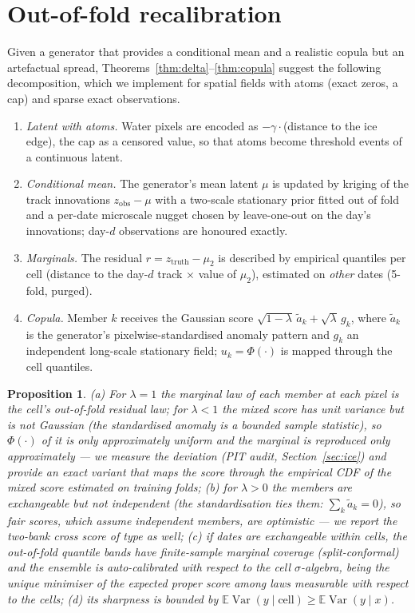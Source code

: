 \documentclass[11pt]{article}
\newtheorem{proposition}{Proposition}
\newcommand{\E}{\mathbb{E}}
\begin{document}
\section{Out-of-fold recalibration}
\label{sec:layer}
Given a generator that provides a conditional mean and a realistic copula but an artefactual spread, Theorems~\ref{thm:delta}--\ref{thm:copula} suggest the following decomposition, which we implement for spatial fields with atoms (exact zeros, a cap) and sparse exact observations.
\begin{enumerate}
\item \emph{Latent with atoms.} Water pixels are encoded as $-\gamma\cdot$(distance to the ice edge), the cap as a censored value, so that atoms become threshold events of a continuous latent.
\item \emph{Conditional mean.} The generator's mean latent $\mu$ is updated by kriging of the track innovations $z_{\mathrm{obs}}-\mu$ with a two-scale stationary prior fitted out of fold and a per-date microscale nugget chosen by leave-one-out on the day's innovations; day-$d$ observations are honoured exactly.
\item \emph{Marginals.} The residual $r=z_{\mathrm{truth}}-\mu_2$ is described by empirical quantiles per cell (distance to the day-$d$ track $\times$ value of $\mu_2$), estimated on \emph{other} dates (5-fold, purged).
\item \emph{Copula.} Member $k$ receives the Gaussian score $\sqrt{1-\lambda}\,\tilde a_k+\sqrt\lambda\,g_k$, where $\tilde a_k$ is the generator's pixelwise-standardised anomaly pattern and $g_k$ an independent long-scale stationary field; $u_k=\Phi(\cdot)$ is mapped through the cell quantiles.
\end{enumerate}
\begin{proposition}
\label{prop:layer}
(a) For $\lambda=1$ the marginal law of each member at each pixel is the cell's out-of-fold residual law; for $\lambda<1$ the mixed score has unit variance but is not Gaussian (the standardised anomaly is a bounded sample statistic), so $\Phi(\cdot)$ of it is only approximately uniform and the marginal is reproduced only approximately --- we measure the deviation (PIT audit, Section~\ref{sec:ice}) and provide an exact variant that maps the score through the empirical CDF of the mixed score estimated on training folds; (b) for $\lambda>0$ the members are exchangeable but not independent (the standardisation ties them: $\sum_k\tilde a_k=0$), so fair scores, which assume independent members, are optimistic --- we report the two-bank cross score of \citet{roberts2026} type as well; (c) if dates are exchangeable within cells, the out-of-fold quantile bands have finite-sample marginal coverage (split-conformal) and the ensemble is auto-calibrated with respect to the cell $\sigma$-algebra, being the unique minimiser of the expected proper score among laws measurable with respect to the cells; (d) its sharpness is bounded by $\E\operatorname{Var}(y\mid\text{cell})\ge\E\operatorname{Var}(y\mid x)$.
\end{proposition}
\end{document}

